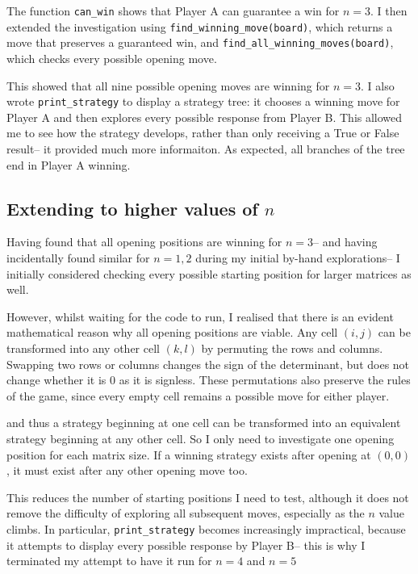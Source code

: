\documentclass[11pt]{article}
\newcommand{\keywordfont}{\textsc}
\newcommand{\keyword}[1]{%
  \marginpar{\raggedright\small\keywordfont{#1}}}
\begin{document}
The function \texttt{can\_win} shows that Player A can guarantee a win for $n=3$. I then extended the investigation using \texttt{find\_winning\_move(board)}, which returns a move that preserves a guaranteed win, and \texttt{find\_all\_winning\_moves(board)}, which checks every possible opening move.

This showed that all nine possible opening moves are winning for $n=3$. I also wrote \texttt{print\_strategy} to display a strategy tree: it chooses a winning move for Player A and then explores every possible response from Player B. This allowed me to see how the strategy develops, rather than only receiving a True or False result-- it provided much more informaiton. As expected, all branches of the tree end in Player A winning. 

\subsection*{Extending to higher values of $n$}

Having found that all opening positions are winning for $n=3$-- and having incidentally found similar for $n=1,2$ during my initial by-hand explorations-- I initially considered checking every possible starting position for larger matrices as well.

However, whilst \keyword{AHA} waiting for the code to run, I realised that there is an evident mathematical reason why all opening positions are viable. Any cell $(i,j)$ can be transformed into any other cell $(k,l)$ by permuting the rows and columns. Swapping two rows or columns changes the sign of the determinant, but does not change whether it is $0$ as it is signless. These permutations also preserve the rules of the game, since every empty cell remains a possible move for either player.

 and thus a strategy beginning \keyword{Therefore} at one cell can be transformed into an equivalent strategy beginning at any other cell. So I only need to investigate one opening position for each matrix size. If a winning strategy exists after opening at $(0,0)$, it must exist after any other opening move too.

This reduces the number of starting positions I need to test, although it does not remove the difficulty of exploring all subsequent moves, especially as the $n$ value climbs. In particular, \texttt{print\_strategy} becomes increasingly impractical, because it attempts to display every possible response by Player B-- this is why I terminated my attempt to have it run for $n=4$ and $n=5$
\end{document}
